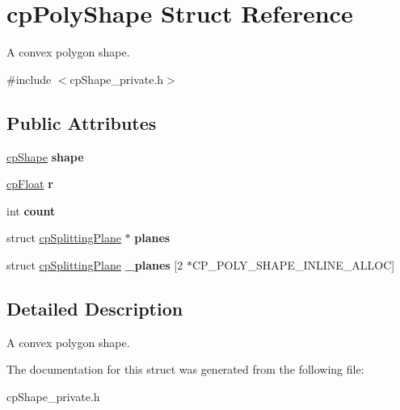 \hypertarget{structcp_poly_shape}{}\section{cp\+Poly\+Shape Struct Reference}
\label{structcp_poly_shape}


A convex polygon shape.  




{\ttfamily \#include $<$cp\+Shape\+\_\+private.\+h$>$}

\subsection*{Public Attributes}
\begin{DoxyCompactItemize}
\item 
\hypertarget{structcp_poly_shape_ac012e90aea902a2148bd5b43028d2e33}{}\hyperlink{structcp_shape}{cp\+Shape} {\bfseries shape}\label{structcp_poly_shape_ac012e90aea902a2148bd5b43028d2e33}

\item 
\hypertarget{structcp_poly_shape_adeca191bc792ac86ad2e0e4b454ddbd3}{}\hyperlink{group__basic_types_gac1ed65573e035bf892505768c852d8d3}{cp\+Float} {\bfseries r}\label{structcp_poly_shape_adeca191bc792ac86ad2e0e4b454ddbd3}

\item 
\hypertarget{structcp_poly_shape_abfb92a30816b97bfc1bb34fb7246c26d}{}int {\bfseries count}\label{structcp_poly_shape_abfb92a30816b97bfc1bb34fb7246c26d}

\item 
\hypertarget{structcp_poly_shape_aac3e3f0ea0474c6caf6c91a31374a928}{}struct \hyperlink{structcp_splitting_plane}{cp\+Splitting\+Plane} $\ast$ {\bfseries planes}\label{structcp_poly_shape_aac3e3f0ea0474c6caf6c91a31374a928}

\item 
\hypertarget{structcp_poly_shape_a12a9e302a3f107cbe9e6087abe8abc2b}{}struct \hyperlink{structcp_splitting_plane}{cp\+Splitting\+Plane} {\bfseries \+\_\+planes} \mbox{[}2 $\ast$C\+P\+\_\+\+P\+O\+L\+Y\+\_\+\+S\+H\+A\+P\+E\+\_\+\+I\+N\+L\+I\+N\+E\+\_\+\+A\+L\+L\+O\+C\mbox{]}\label{structcp_poly_shape_a12a9e302a3f107cbe9e6087abe8abc2b}

\end{DoxyCompactItemize}


\subsection{Detailed Description}
A convex polygon shape. 

The documentation for this struct was generated from the following file\+:\begin{DoxyCompactItemize}
\item 
cp\+Shape\+\_\+private.\+h\end{DoxyCompactItemize}
